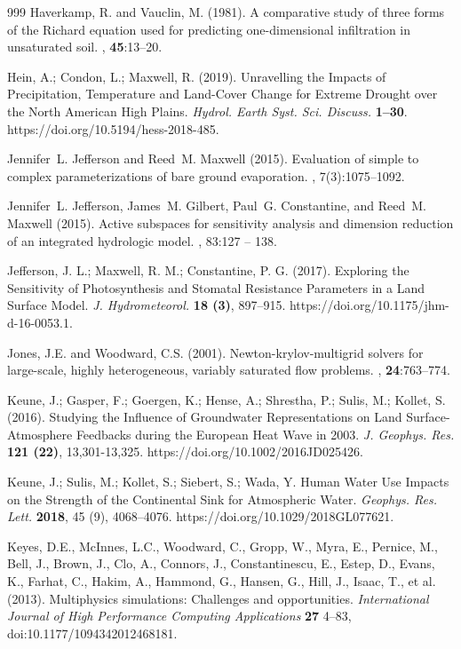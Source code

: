 \begin{thebibliography}{999}
Haverkamp, R. and Vauclin, M. (1981).
\newblock A comparative study of three forms of the {R}ichard equation used for
  predicting one-dimensional infiltration in unsaturated soil.
, {\bf 45}:13--20.

Hein, A.; Condon, L.; Maxwell, R. (2019). Unravelling the Impacts of Precipitation, Temperature and Land-Cover Change for Extreme Drought over the North American High Plains. {\em Hydrol. Earth Syst. Sci. Discuss.} {\bf 1–30}. https://doi.org/10.5194/hess-2018-485.

	Jennifer~L. Jefferson and Reed~M. Maxwell (2015).
\newblock Evaluation of simple to complex parameterizations of bare ground
  evaporation.
, 7(3):1075--1092.

Jennifer~L. Jefferson, James~M. Gilbert, Paul~G. Constantine, and Reed~M.
Maxwell (2015).
\newblock Active subspaces for sensitivity analysis and dimension reduction of
  an integrated hydrologic model.
, 83:127 -- 138.

Jefferson, J. L.; Maxwell, R. M.; Constantine, P. G. (2017). Exploring the Sensitivity of Photosynthesis and Stomatal Resistance Parameters in a Land Surface Model. {\em J. Hydrometeorol.} {\bf 18 (3)}, 897–915. https://doi.org/10.1175/jhm-d-16-0053.1.


Jones, J.E. and Woodward, C.S. (2001).
\newblock Newton-krylov-multigrid solvers for large-scale, highly heterogeneous, variably saturated flow problems.
, {\bf 24}:763--774.


Keune, J.; Gasper, F.; Goergen, K.; Hense, A.; Shrestha, P.; Sulis, M.; Kollet, S. (2016). Studying the Influence of Groundwater Representations on Land Surface-Atmosphere Feedbacks during the European Heat Wave in 2003. {\em J. Geophys. Res.} {\bf 121 (22)}, 13,301-13,325. https://doi.org/10.1002/2016JD025426.


Keune, J.; Sulis, M.; Kollet, S.; Siebert, S.; Wada, Y. Human Water Use Impacts on the Strength of the Continental Sink for Atmospheric Water. {\em Geophys. Res. Lett.} {\bf 2018}, 45 (9), 4068–4076. https://doi.org/10.1029/2018GL077621.

Keyes, D.E., McInnes, L.C., Woodward, C., Gropp, W., Myra, E., Pernice, M., Bell, J., Brown, J., Clo, A., Connors, J., Constantinescu, E., Estep, D., Evans, K., Farhat, C., Hakim, A., Hammond, G., Hansen, G., Hill, J., Isaac, T., et al. (2013). Multiphysics simulations: Challenges and opportunities. {\em International Journal of High Performance Computing Applications} {\bf 27} 4--83, doi:10.1177/1094342012468181.



\end{thebibliography}
